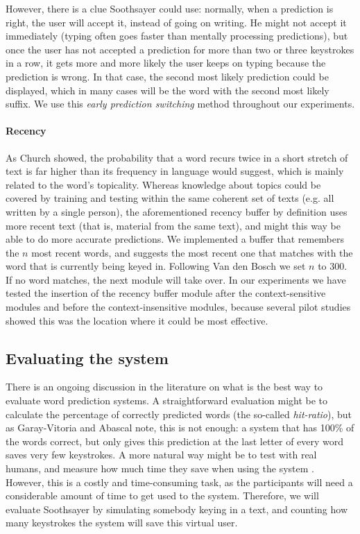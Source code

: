 \documentclass[12pt]{article}
\begin{document}
However, there is a clue Soothsayer could use: normally, when a prediction is right, the user will accept it, instead of going on writing. He might not accept it immediately (typing often goes faster than mentally processing predictions), but once the user has not accepted a prediction for more than two or three keystrokes in a row, it gets more and more likely the user keeps on typing because the prediction is wrong. In that case, the second most likely prediction could be displayed, which in many cases will be the word with the second most likely suffix. We use this \emph{early prediction switching} method throughout our experiments.

\paragraph{Recency} \label{rb}

As Church \citeyear{church02} showed, the probability that a word recurs twice in a short stretch of text is far higher than its  frequency in language would suggest, which is mainly related to the word's topicality. Whereas knowledge about topics could be covered by training and testing within the same coherent set of texts (e.g. all written by a single person), the aforementioned recency buffer by definition uses more recent text (that is, material from the same text), and might this way be able to do more accurate predictions. We implemented a buffer that remembers the $n$ most recent words, and suggests the most recent one that matches with the word that is currently being keyed in. Following Van den Bosch \citeyear{vandenbosch11} we set $n$ to 300. If no word matches, the next module will take over. In our experiments we have tested the insertion of the recency buffer module after the context-sensitive modules and before the context-insensitive modules, because several pilot studies showed this was the location where it could be most effective.

\subsection{Evaluating the system} \label{evaluation}

There is an ongoing discussion in the literature on what is the best way to evaluate word prediction systems. A straightforward evaluation might be to calculate the percentage of correctly predicted words (the so-called \emph{hit-ratio}), but as Garay-Vitoria and Abascal \citeyear{Garay-Vitoria+06} note, this is not enough: a system that has 100\% of the words correct, but only gives this prediction at the last letter of every word saves very few keystrokes. A more natural way might be to test with real humans, and measure how much time they save when using the system \cite{carlberger+97,koester+98,Garay-Vitoria+06}. However, this is a costly and time-consuming task, as the participants will need a considerable amount of time to get used to the system. Therefore, we will evaluate Soothsayer by simulating somebody keying in a text, and counting how many keystrokes the system will save this virtual user. 
\end{document}
